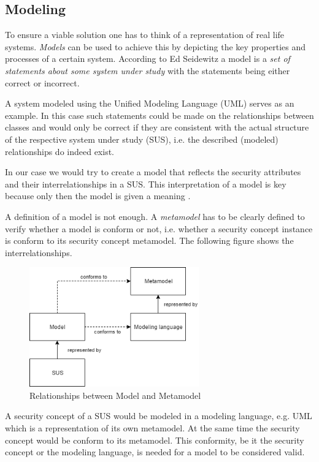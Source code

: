 \subsection{Modeling}
\label{subsec:interpretation}
To ensure a viable solution one has to think of a representation of real life systems. \textit{Models} can be used to achieve this by depicting the key properties and processes of a certain system. According to Ed Seidewitz \cite{seidewitz} a model is a \textit{\glqq set of statements about some system under study\grqq} with the statements being either correct or incorrect.

A system modeled using the Unified Modeling Language (UML) serves as an example. In this case such statements could be made on the relationships between classes and would only be correct if they are consistent with the actual structure of the respective system under study (SUS), i.e. the described (modeled) relationships do indeed exist. 

In our case we would try to create a model that reflects the security attributes and their interrelationships in a SUS. This interpretation of a model is key because only then the model is given a meaning \cite{seidewitz}.

A definition of a model is not enough. A \textit{metamodel} has to be clearly defined to verify whether a model is conform or not, i.e. whether a security concept instance is conform to its security concept metamodel. The following figure shows the interrelationships.

\begin{figure}[H]
\centering
\includegraphics[width=0.65\textwidth]{pictures/metamodel.png}
\caption{Relationships between Model and Metamodel}
\label{fig:metamodel}
\end{figure}

A security concept of a SUS would be modeled in a modeling language, e.g. UML which is a representation of its own metamodel. At the same time the security concept would be conform to its metamodel. This conformity, be it the security concept or the modeling language, is needed for a model to be considered valid. 

